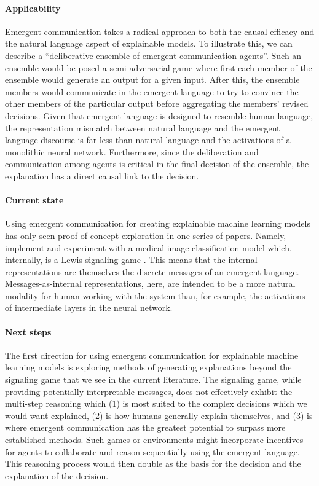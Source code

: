 \paragraph{Applicability}
Emergent communication takes a radical approach to both the causal efficacy and the natural language aspect of explainable models.
To illustrate this, we can describe a ``deliberative ensemble of emergent communication agents''.
Such an ensemble would be posed a semi-adversarial game where first each member of the ensemble would generate an output for a given input.
After this, the ensemble members would communicate in the emergent language to try to convince the other members of the particular output before aggregating the members' revised decisions.
Given that emergent language is designed to resemble human language, the representation mismatch between natural language and the emergent language discourse is far less than natural language and the activations of a monolithic neural network.
Furthermore, since the deliberation and communication among agents is critical in the final decision of the ensemble, the explanation has a direct causal link to the decision.


\paragraph{Current state}
Using emergent communication for creating explainable machine learning models has only seen proof-of-concept exploration in one series of papers.
Namely, \citet{santamaria2020towards,chowdhury2020escell,chowdhury2020symbolic,chowdhury2020emergent} implement and experiment with a medical image classification model which, internally, is a Lewis signaling game \citep{lewis1970ConventionAP}.
This means that the internal representations are themselves the discrete messages of an emergent language.
Messages-as-internal representations, here, are intended to be a more natural modality for human working with the system than, for example, the activations of intermediate layers in the neural network.


\paragraph{Next steps}
The first direction for using emergent communication for explainable machine learning models is exploring methods of generating explanations beyond the signaling game that we see in the current literature.
The signaling game, while providing potentially interpretable messages, does not effectively exhibit the multi-step reasoning which
    (1) is most suited to the complex decisions which we would want explained,
    (2) is how humans generally explain themselves,
    and (3) is where emergent communication has the greatest potential to surpass more established methods.
Such games or environments might incorporate incentives for agents to collaborate and reason sequentially using the emergent language.
This reasoning process would then double as the basis for the decision and the explanation of the decision.

